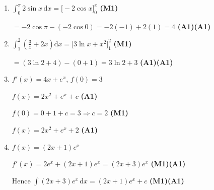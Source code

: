 \documentclass[12pt, twoside]{article}
\begin{document}
\begin{enumerate}[itemsep=0.4cm]
\item $\displaystyle\int_0^{\pi} 2\sin x\,\mathrm{d}x
= \bigl[-2\cos x\bigr]_0^{\pi}$
\hfill \textbf{(M1)}

$= -2\cos\pi - (-2\cos 0) = -2(-1) + 2(1) = 4$
\hfill \textbf{(A1)(A1)}

\item $\displaystyle\int_1^2 \!\left(\frac{3}{x} + 2x\right)\mathrm{d}x
= \bigl[3\ln x + x^2\bigr]_1^2$
\hfill \textbf{(M1)}

$= (3\ln 2 + 4) - (0 + 1) = 3\ln 2 + 3$
\hfill \textbf{(A1)(A1)}

\item $f'(x) = 4x + e^x$, \quad $f(0) = 3$

$f(x) = 2x^2 + e^x + c$ \hfill \textbf{(A1)}

$f(0) = 0 + 1 + c = 3 \Rightarrow c = 2$ \hfill \textbf{(M1)}

$f(x) = 2x^2 + e^x + 2$ \hfill \textbf{(A1)}

\item $f(x) = (2x + 1)e^x$

$f'(x) = 2e^x + (2x + 1)e^x = (2x + 3)e^x$ \hfill \textbf{(M1)(A1)}

Hence $\displaystyle\int (2x + 3)e^x\,\mathrm{d}x = (2x + 1)e^x + c$
\hfill \textbf{(M1)(A1)}

\end{enumerate}
\end{document}
